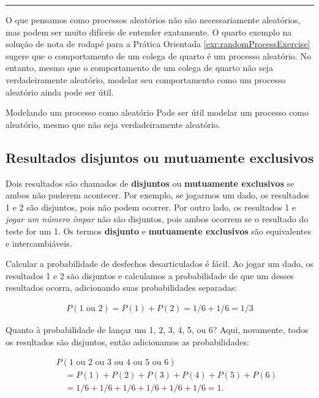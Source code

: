 \documentclass[
]{book}
\theoremstyle{definition}
\theoremstyle{definition}
\theoremstyle{definition}
\theoremstyle{definition}
\theoremstyle{remark}
\begin{document}
\begin{center}\rule{0.5\linewidth}{0.5pt}\end{center}

O que pensamos como processos aleatórios não são necessariamente aleatórios, mas podem ser muito difíceis de entender exatamente. O quarto exemplo na solução de nota de rodapé para a Prática Orientada \ref{exr:randomProcessExercise} sugere que o comportamento de um colega de quarto é um processo aleatório. No entanto, mesmo que o comportamento de um colega de quarto não seja verdadeiramente aleatório, modelar seu comportamento como um processo aleatório ainda pode ser útil.

Modelando um processo como aleatório Pode ser útil modelar um processo como aleatório, mesmo que não seja verdadeiramente aleatório.

\hypertarget{disjointMutuallyExclusiveResults}{%
\subsection{Resultados disjuntos ou mutuamente exclusivos}\label{disjointMutuallyExclusiveResults}}

Dois resultados são chamados de \textbf{disjuntos} ou \textbf{mutuamente exclusivos} se ambos não puderem acontecer. Por exemplo, se jogarmos um dado, os resultados 1 e 2 são disjuntos, pois não podem ocorrer. Por outro lado, os resultados 1 e \emph{jogar um número ímpar} não são disjuntos, pois ambos ocorrem se o resultado do teste for um 1. Os termos \textbf{disjunto} e \textbf{mutuamente exclusivos} são equivalentes e intercambiáveis.

Calcular a probabilidade de desfechos desarticulados é fácil. Ao jogar um dado, os resultados 1 e 2 são disjuntos e calculamos a probabilidade de que um desses resultados ocorra, adicionando suas probabilidades separadas:

\begin{eqnarray*}
P(\text{1 ou 2}) = P(\text{1}) + P(\text{2}) = 1/6 + 1/6 = 1/3
\end{eqnarray*}

Quanto à probabilidade de lançar um 1, 2, 3, 4, 5, ou 6? Aqui, novamente, todos os resultados são disjuntos, então adicionamos as probabilidades:

\begin{eqnarray*}
&&P(\text{1 ou 2 ou 3 ou 4 ou 5 ou 6}) \\
    &&\quad= P(\text{1})+P(\text{2})+P(\text{3})+P(\text{4})+P(\text{5})+P(\text{6}) \\
    &&\quad= 1/6 + 1/6 + 1/6 + 1/6 + 1/6 + 1/6 = 1.
\end{eqnarray*}
\end{document}
